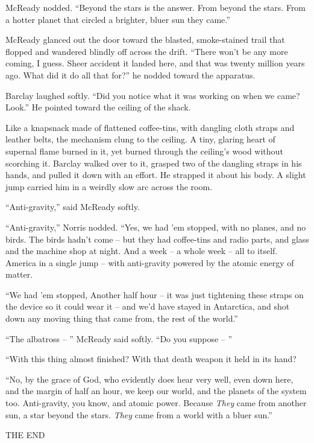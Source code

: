 \documentclass[ebook,oneside,11pt]{memoir}				%
\begin{document}
McReady nodded. ``Beyond the stars is the answer. From beyond the stars. From a hotter planet that circled a brighter, bluer sun they came.''

McReady glanced out the door toward the blasted, smoke-stained trail that flopped and wandered blindly off across the drift. ``There won't be any more coming, I guess. Sheer accident it landed here, and that was twenty million years ago. What did it do all that for?'' he nodded toward the apparatus.

Barclay laughed softly. ``Did you notice what it was working on when we came? Look.'' He pointed toward the ceiling of the shack.

Like a knapsnack made of flattened coffee-tins, with dangling cloth straps and leather belts, the mechanism clung to the ceiling. A tiny, glaring heart of supernal flame burned in it, yet burned through the ceiling's wood without scorching it. Barclay walked over to it, grasped two of the dangling straps in his hands, and pulled it down with an effort. He strapped it about his body. A slight jump carried him in a weirdly slow arc across the room.

``Anti-gravity,'' said McReady softly.

``Anti-gravity,'' Norris nodded. ``Yes, we had 'em stopped, with no planes, and no birds. The birds hadn't come -- but they had coffee-tins and radio parts, and glass and the machine shop at night. And a week -- a whole week -- all to itself. America in a single jump -- with anti-gravity powered by the atomic energy of matter.

``We had 'em stopped, Another half hour -- it was just tightening these straps on the device so it could wear it -- and we'd have stayed in Antarctica, and shot down any moving thing that came from, the rest of the world.''

``The albatross -- '' McReady said softly. ``Do you suppose -- ''

``With this thing almost finished? With that death weapon it held in its hand?

``No, by the grace of God, who evidently does hear very well, even down here, and the margin of half an hour, we keep our world, and the planets of the system too. Anti-gravity, you know, and atomic power. Because \emph{They} came from another sun, a star beyond the stars. \emph{They} came from a world with a bluer sun.'' 

\vspace{30pt}

\begin{center}
{\chaptertitles THE END}
\end{center}
\end{document}
